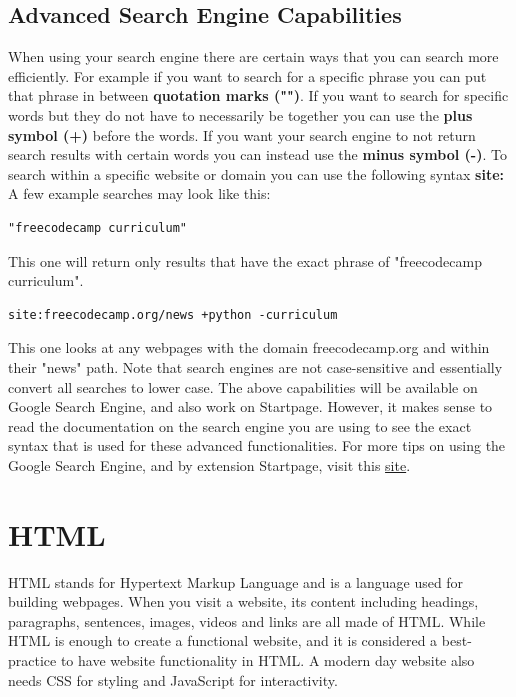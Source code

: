 \documentclass[11pt]{article}
\begin{document}
\subsection{Advanced Search Engine Capabilities}
\label{sec:org7b42b84}
When using your search engine there are certain ways that you can search more efficiently. For
example if you want to search for a specific phrase you can put that phrase in between \textbf{quotation
marks ("")}. If you want to search for specific words but they do not have to necessarily be together
you can use the \textbf{plus symbol (+)} before the words. If you want your search engine to not return
search results with certain words you can instead use the \textbf{minus symbol (-)}. To search within a
specific website or domain you can use the following syntax \textbf{site:}
A few example searches may look like this:
\begin{verbatim}
"freecodecamp curriculum"
\end{verbatim}
This one will return only results that have the exact phrase of "freecodecamp curriculum".
\begin{verbatim}
site:freecodecamp.org/news +python -curriculum
\end{verbatim}
This one looks at any webpages with the domain freecodecamp.org and within their "news" path.
Note that search engines are not case-sensitive and essentially convert all searches to lower
case. The above capabilities will be available on Google Search Engine, and also work on
Startpage. However, it makes sense to read the documentation on the search engine you are using to
see the exact syntax that is used for these advanced functionalities.
For more tips on using the Google Search Engine, and by extension Startpage, visit this \href{https://woodward.libguides.com/google/basicsearch}{site}.
\section{HTML}
\label{sec:orga87767d}
HTML stands for Hypertext Markup Language and is a language used for building webpages. When you
visit a website, its content including headings, paragraphs, sentences, images, videos and links are
all made of HTML.
While HTML is enough to create a functional website, and it is considered a best-practice to have
website functionality in HTML. A modern day website also needs CSS for styling and JavaScript for
interactivity.
\end{document}
